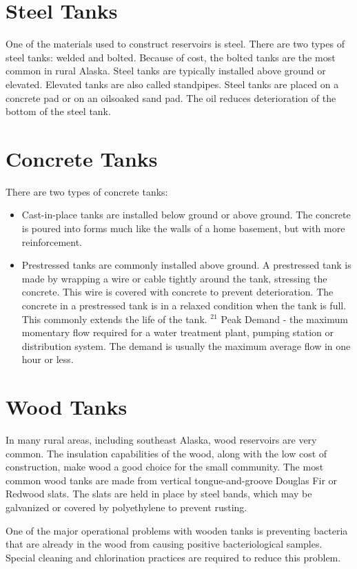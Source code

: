 \documentclass[10pt]{article}
\begin{document}
\section{Steel Tanks}
One of the materials used to construct reservoirs is steel. There are two types of steel tanks: welded and bolted. Because of cost, the bolted tanks are the most common in rural Alaska. Steel tanks are typically installed above ground or elevated. Elevated tanks are also called standpipes. Steel tanks are placed on a concrete pad or on an oilsoaked sand pad. The oil reduces deterioration of the bottom of the steel tank.

\section{Concrete Tanks}
There are two types of concrete tanks:

\begin{itemize}
  \item Cast-in-place tanks are installed below ground or above ground. The concrete is poured into forms much like the walls of a home basement, but with more reinforcement.

  \item Prestressed tanks are commonly installed above ground. A prestressed tank is made by wrapping a wire or cable tightly around the tank, stressing the concrete. This wire is covered with concrete to prevent deterioration. The concrete in a prestressed tank is in a relaxed condition when the tank is full. This commonly extends the life of the tank. ${ }^{21}$ Peak Demand - the maximum momentary flow required for a water treatment plant, pumping station or distribution system. The demand is usually the maximum average flow in one hour or less.

\end{itemize}
\section{Wood Tanks}
In many rural areas, including southeast Alaska, wood reservoirs are very common. The insulation capabilities of the wood, along with the low cost of construction, make wood a good choice for the small community. The most common wood tanks are made from vertical tongue-and-groove Douglas Fir or Redwood slats. The slats are held in place by steel bands, which may be galvanized or covered by polyethylene to prevent rusting.

One of the major operational problems with wooden tanks is preventing bacteria that are already in the wood from causing positive bacteriological samples. Special cleaning and chlorination practices are required to reduce this problem.
\end{document}
